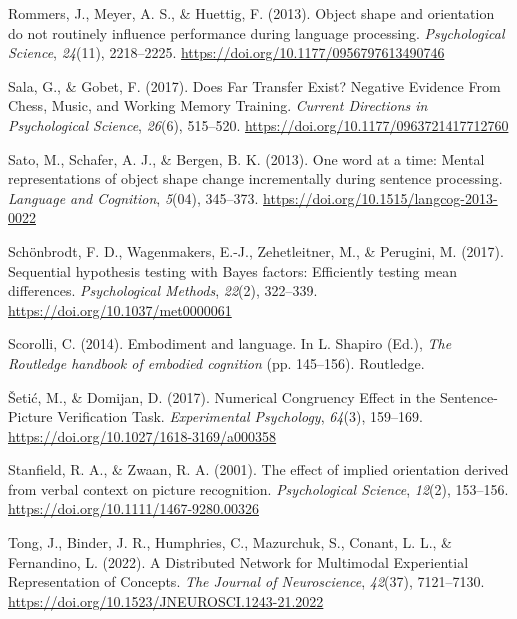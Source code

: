 \documentclass[
  man,floatsintext]{apa7}
\newlength{\cslhangindent}
\newlength{\cslentryspacingunit} %
\newenvironment{CSLReferences}[2] %
 {%
  \setlength{\parindent}{0pt}
  \ifodd #1
  \let\oldpar\par
  \def\par{\hangindent=\cslhangindent\oldpar}
  \fi
  \setlength{\parskip}{#2\cslentryspacingunit}
 }%
 {}
\begin{document}
\begin{CSLReferences}{1}{0}
\leavevmode{}%
Rommers, J., Meyer, A. S., \& Huettig, F. (2013). Object shape and orientation do not routinely influence performance during language processing. \emph{Psychological Science}, \emph{24}(11), 2218--2225. \url{https://doi.org/10.1177/0956797613490746}

\leavevmode{}%
Sala, G., \& Gobet, F. (2017). Does Far Transfer Exist? Negative Evidence From Chess, Music, and Working Memory Training. \emph{Current Directions in Psychological Science}, \emph{26}(6), 515--520. \url{https://doi.org/10.1177/0963721417712760}

\leavevmode{}%
Sato, M., Schafer, A. J., \& Bergen, B. K. (2013). One word at a time: {Mental} representations of object shape change incrementally during sentence processing. \emph{Language and Cognition}, \emph{5}(04), 345--373. \url{https://doi.org/10.1515/langcog-2013-0022}

\leavevmode{}%
Schönbrodt, F. D., Wagenmakers, E.-J., Zehetleitner, M., \& Perugini, M. (2017). Sequential hypothesis testing with {Bayes} factors: {Efficiently} testing mean differences. \emph{Psychological Methods}, \emph{22}(2), 322--339. \url{https://doi.org/10.1037/met0000061}

\leavevmode{}%
Scorolli, C. (2014). Embodiment and language. In L. Shapiro (Ed.), \emph{The {Routledge} handbook of embodied cognition} (pp. 145--156). {Routledge}.

\leavevmode{}%
Šetić, M., \& Domijan, D. (2017). Numerical {Congruency Effect} in the {Sentence-Picture Verification Task}. \emph{Experimental Psychology}, \emph{64}(3), 159--169. \url{https://doi.org/10.1027/1618-3169/a000358}

\leavevmode{}%
Stanfield, R. A., \& Zwaan, R. A. (2001). The effect of implied orientation derived from verbal context on picture recognition. \emph{Psychological Science}, \emph{12}(2), 153--156. \url{https://doi.org/10.1111/1467-9280.00326}

\leavevmode{}%
Tong, J., Binder, J. R., Humphries, C., Mazurchuk, S., Conant, L. L., \& Fernandino, L. (2022). A Distributed Network for Multimodal Experiential Representation of Concepts. \emph{The Journal of Neuroscience}, \emph{42}(37), 7121--7130. \url{https://doi.org/10.1523/JNEUROSCI.1243-21.2022}


\end{CSLReferences}
\end{document}
